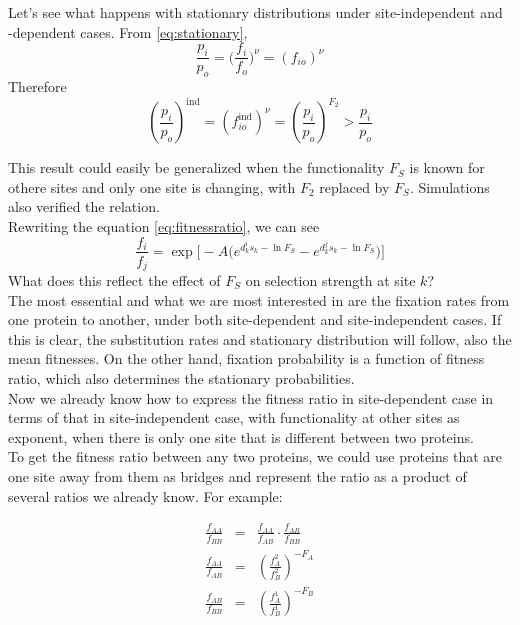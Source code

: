 \documentclass[13pt]{article}
\begin{document}
\begin{enumerate}
Let's see what happens with stationary distributions under site-independent and -dependent cases. From \eqref{eq:stationary}, 
\begin{equation}
\frac{p_i}{p_o} = \big(\frac{f_i}{f_o}\big)^\nu = (f_{io})^\nu
\end{equation}
Therefore 
\begin{equation}
(\frac{p_i}{p_o})^{\text{ind}} = (f_{io}^{\text{ind}})^\nu = (\frac{p_i}{p_o})^{F_2} > \frac{p_i}{p_o}
\end{equation}

This result could easily be generalized when the functionality $F_S$ is known for othere sites and only one site is changing, with $F_2$ replaced by $F_S$. Simulations also verified the relation.\\

Rewriting the equation \eqref{eq:fitnessratio}, we can see
\begin{equation}
\frac{f_i}{f_j} = \exp\Big[-A\Big(e^{d_k^i s_k - \ln F_S} - e^{d_k^j s_k -  \ln F_S}\Big)\Big]
\end{equation}
What does this reflect the effect of $F_S$ on selection strength at site $k$?\\

The most essential and what we are most interested in are the fixation rates from one protein to another, under both site-dependent and site-independent cases. If this is clear, the substitution rates and stationary distribution will follow, also the mean fitnesses. On the other hand, fixation probability is a function of fitness ratio, which also determines the stationary probabilities.\\

Now we already know how to express the fitness ratio in site-dependent case in terms of that in site-independent case, with functionality at other sites as exponent, when there is only one site that is different between two proteins. \\

To get the fitness ratio between any two proteins, we could use proteins that are one site away from them as bridges and represent the ratio as a product of several ratios we already know. For example:

\begin{eqnarray*}
\frac{f_{AA}}{f_{BB}} & = & \frac{f_{AA}}{f_{AB}} \cdot \frac{f_{AB}}{f_{BB}}\\
\frac{f_{AA}}{f_{AB}} & = &(\frac{f^2_A}{f^2_B})^{-F_A}\\
\frac{f_{AB}}{f_{BB}} & = &(\frac{f^1_A}{f^1_B})^{-F_B}
\end{eqnarray*}


\end{enumerate}
\end{document}
